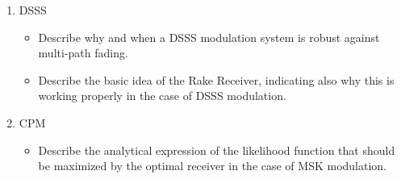 \documentclass[11pt]{article}
\begin{document}
\begin{enumerate}
\item DSSS
\begin{itemize}
\item Describe why and when a DSSS modulation system is robust against multi-path fading.
\item Describe the basic idea of the Rake Receiver, indicating also why this is working properly in the case of DSSS modulation.
\end{itemize}
\item CPM
\begin{itemize}
\item Describe the analytical expression of the likelihood function that should be maximized by the optimal receiver in the case of MSK modulation.
\end{itemize}


\end{enumerate}
\end{document}
